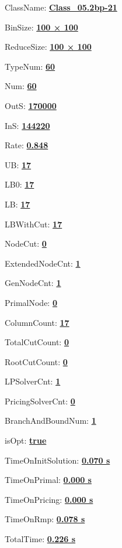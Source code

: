 \documentclass[11pt]{article}
\begin{document}
\pagestyle{empty}


ClassName: \underline{\textbf{Class_05.2bp-21}}
\par
BinSize: \underline{\textbf{100 × 100}}
\par
ReduceSize: \underline{\textbf{100 × 100}}
\par
TypeNum: \underline{\textbf{60}}
\par
Num: \underline{\textbf{60}}
\par
OutS: \underline{\textbf{170000}}
\par
InS: \underline{\textbf{144220}}
\par
Rate: \underline{\textbf{0.848}}
\par
UB: \underline{\textbf{17}}
\par
LB0: \underline{\textbf{17}}
\par
LB: \underline{\textbf{17}}
\par
LBWithCut: \underline{\textbf{17}}
\par
NodeCut: \underline{\textbf{0}}
\par
ExtendedNodeCnt: \underline{\textbf{1}}
\par
GenNodeCnt: \underline{\textbf{1}}
\par
PrimalNode: \underline{\textbf{0}}
\par
ColumnCount: \underline{\textbf{17}}
\par
TotalCutCount: \underline{\textbf{0}}
\par
RootCutCount: \underline{\textbf{0}}
\par
LPSolverCnt: \underline{\textbf{1}}
\par
PricingSolverCnt: \underline{\textbf{0}}
\par
BranchAndBoundNum: \underline{\textbf{1}}
\par
isOpt: \underline{\textbf{true}}
\par
TimeOnInitSolution: \underline{\textbf{0.070 s}}
\par
TimeOnPrimal: \underline{\textbf{0.000 s}}
\par
TimeOnPricing: \underline{\textbf{0.000 s}}
\par
TimeOnRmp: \underline{\textbf{0.078 s}}
\par
TotalTime: \underline{\textbf{0.226 s}}
\par
\newpage


\end{document}
